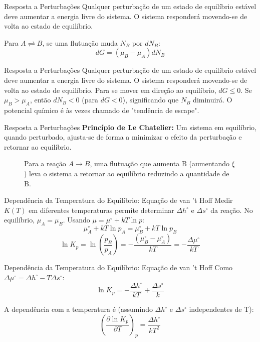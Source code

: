 \documentclass{beamer}
\begin{document}
\begin{frame}{Resposta a Perturbações}
        Qualquer perturbação de um estado de equilíbrio estável deve aumentar a energia livre do sistema. O sistema responderá movendo-se de volta ao estado de equilíbrio.
        
        Para $A \rightleftharpoons B$, se uma flutuação muda $N_B$ por $dN_B$:
        $$ dG = (\mu_B - \mu_A)dN_B $$
        
        
\end{frame}
\begin{frame}{Resposta a Perturbações}
        Qualquer perturbação de um estado de equilíbrio estável deve aumentar a energia livre do sistema. O sistema responderá movendo-se de volta ao estado de equilíbrio.
        Para se mover em direção ao equilíbrio, $dG \le 0$.
        Se $\mu_B > \mu_A$, então $dN_B < 0$ (para $dG < 0$), significando que $N_B$ diminuirá.
        O potencial químico é às vezes chamado de "tendência de escape".
        
\end{frame}
\begin{frame}{Resposta a Perturbações}
        \textbf{Princípio de Le Chatelier:} Um sistema em equilíbrio, quando perturbado, ajusta-se de forma a minimizar o efeito da perturbação e retornar ao equilíbrio.
        \begin{figure}
        \centering
        \caption{Para a reação $A \rightarrow B$, uma flutuação que aumenta B (aumentando $\xi$) leva o sistema a retornar ao equilíbrio reduzindo a quantidade de B.}
        \end{figure}
\end{frame}

\begin{frame}{Dependência da Temperatura do Equilíbrio: Equação de van 't Hoff}
    Medir $K(T)$ em diferentes temperaturas permite determinar $\Delta h^{\circ}$ e $\Delta s^{\circ}$ da reação.
    No equilíbrio, $\mu_A = \mu_B$. Usando $\mu = \mu^{\circ} + kT \ln p$:
    $$ \mu_A^{\circ} + kT \ln p_A = \mu_B^{\circ} + kT \ln p_B $$
    $$ \ln K_p = \ln\left(\frac{p_B}{p_A}\right) = -\frac{(\mu_B^{\circ} - \mu_A^{\circ})}{kT} = -\frac{\Delta\mu^{\circ}}{kT} $$
     
\end{frame}

\begin{frame}{Dependência da Temperatura do Equilíbrio: Equação de van 't Hoff}
    Como $\Delta\mu^{\circ} = \Delta h^{\circ} - T\Delta s^{\circ}$:
    $$ \ln K_p = -\frac{\Delta h^{\circ}}{kT} + \frac{\Delta s^{\circ}}{k} $$
     
    A dependência com a temperatura é (assumindo $\Delta h^{\circ}$ e $\Delta s^{\circ}$ independentes de T):
    $$ \left(\frac{\partial \ln K_p}{\partial T}\right)_p = \frac{\Delta h^{\circ}}{kT^2} $$
     
\end{frame}
\end{document}
